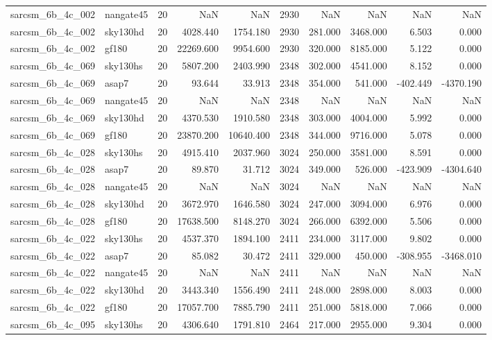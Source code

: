 \begin{tabular}{llrrrrrrrr}
sarcsm\_6b\_4c\_002 & nangate45 & 20 & NaN & NaN & 2930 & NaN & NaN & NaN & NaN \\
sarcsm\_6b\_4c\_002 & sky130hd & 20 & 4028.440 & 1754.180 & 2930 & 281.000 & 3468.000 & 6.503 & 0.000 \\
sarcsm\_6b\_4c\_002 & gf180 & 20 & 22269.600 & 9954.600 & 2930 & 320.000 & 8185.000 & 5.122 & 0.000 \\
sarcsm\_6b\_4c\_069 & sky130hs & 20 & 5807.200 & 2403.990 & 2348 & 302.000 & 4541.000 & 8.152 & 0.000 \\
sarcsm\_6b\_4c\_069 & asap7 & 20 & 93.644 & 33.913 & 2348 & 354.000 & 541.000 & -402.449 & -4370.190 \\
sarcsm\_6b\_4c\_069 & nangate45 & 20 & NaN & NaN & 2348 & NaN & NaN & NaN & NaN \\
sarcsm\_6b\_4c\_069 & sky130hd & 20 & 4370.530 & 1910.580 & 2348 & 303.000 & 4004.000 & 5.992 & 0.000 \\
sarcsm\_6b\_4c\_069 & gf180 & 20 & 23870.200 & 10640.400 & 2348 & 344.000 & 9716.000 & 5.078 & 0.000 \\
sarcsm\_6b\_4c\_028 & sky130hs & 20 & 4915.410 & 2037.960 & 3024 & 250.000 & 3581.000 & 8.591 & 0.000 \\
sarcsm\_6b\_4c\_028 & asap7 & 20 & 89.870 & 31.712 & 3024 & 349.000 & 526.000 & -423.909 & -4304.640 \\
sarcsm\_6b\_4c\_028 & nangate45 & 20 & NaN & NaN & 3024 & NaN & NaN & NaN & NaN \\
sarcsm\_6b\_4c\_028 & sky130hd & 20 & 3672.970 & 1646.580 & 3024 & 247.000 & 3094.000 & 6.976 & 0.000 \\
sarcsm\_6b\_4c\_028 & gf180 & 20 & 17638.500 & 8148.270 & 3024 & 266.000 & 6392.000 & 5.506 & 0.000 \\
sarcsm\_6b\_4c\_022 & sky130hs & 20 & 4537.370 & 1894.100 & 2411 & 234.000 & 3117.000 & 9.802 & 0.000 \\
sarcsm\_6b\_4c\_022 & asap7 & 20 & 85.082 & 30.472 & 2411 & 329.000 & 450.000 & -308.955 & -3468.010 \\
sarcsm\_6b\_4c\_022 & nangate45 & 20 & NaN & NaN & 2411 & NaN & NaN & NaN & NaN \\
sarcsm\_6b\_4c\_022 & sky130hd & 20 & 3443.340 & 1556.490 & 2411 & 248.000 & 2898.000 & 8.003 & 0.000 \\
sarcsm\_6b\_4c\_022 & gf180 & 20 & 17057.700 & 7885.790 & 2411 & 251.000 & 5818.000 & 7.066 & 0.000 \\
sarcsm\_6b\_4c\_095 & sky130hs & 20 & 4306.640 & 1791.810 & 2464 & 217.000 & 2955.000 & 9.304 & 0.000 \\

\end{tabular}
